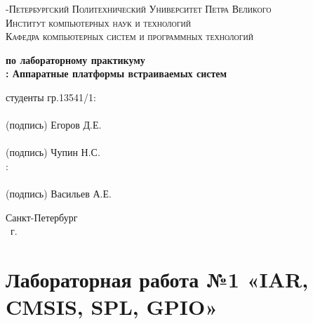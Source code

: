 \documentclass[14pt,a4paper,report]{report}
\begin{document}
\def\contentsname{Содержание}

\begin{titlepage}
	\begin{center}
		\textsc{-Петербургский Политехнический Университет Петра Великого\\[5mm]
Институт компьютерных наук и технологий\\[5mm]
Кафедра компьютерных систем и программных технологий\\[5mm]}
		
		\vfill
		
		\textbf{ по лабораторному практикуму\\[3mm]
			: Аппаратные платформы встраиваемых систем\\[15mm]
		}
	\end{center}
	
	\vfill
\begin{flushright}
	\begin{minipage}{.4\textwidth}
		{ студенты гр.13541/1:\\[2mm] 
		\underline{\hspace{2in}}\\ %
  		\centering
  		\small(подпись)
		Егоров Д.Е. \\[5mm]
		\underline{\hspace{2in}}\\ %
  		\centering
 		 \small(подпись)
		Чупин Н.С. \\[5mm]
		
		:\\[2mm] 
		\underline{\hspace{2in}}\\ %
  		\centering
 		 \small(подпись)
		Васильев А.Е.\\
		}
	\end{minipage}
\end{flushright}
	\vfill
	\begin{center}
		Санкт-Петербург\\ \the\year\ г.
	\end{center}
\end{titlepage}

\tableofcontents
\clearpage

\chapter {Лабораторная работа №1 «IAR, CMSIS, SPL, GPIO»}
\end{document}
